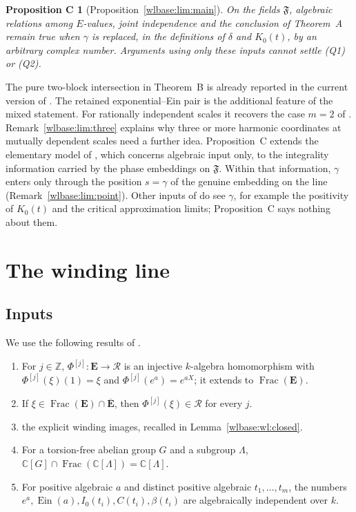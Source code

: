 \documentclass[11pt,a4paper]{article}
\newtheorem*{propC}{Proposition C}
\theoremstyle{definition}\newtheorem{definition}[theorem]{Definition}
\theoremstyle{remark}\newtheorem{remark}[theorem]{Remark}
\newcommand{\E}{\mathbf E}\newcommand{\Ebar}{\overline{\mathbf E}}
\newcommand{\cR}{\mathcal R}\newcommand{\cM}{\mathcal M}
\newcommand{\Ein}{\operatorname{Ein}}
\newcommand{\F}{\mathfrak F}\newcommand{\FF}{\mathbb F}
\newcommand{\C}{\mathbb C}\newcommand{\Z}{\mathbb Z}
\DeclareMathOperator{\Frac}{Frac}\DeclareMathOperator{\ord}{ord}
\begin{document}
\begin{propC}[Proposition~\ref{wlbase:lim:main}]
On the fields $\F$, algebraic relations among $E$-values, joint independence
and the conclusion of Theorem~A remain true when $\gamma$ is replaced, in the
definitions of $\delta$ and $K_0(t)$, by an arbitrary complex number.
Arguments using only these inputs cannot settle \textup{(Q1)} or
\textup{(Q2)}.
\end{propC}

The pure two-block intersection in Theorem~B is already reported in the
current version of \cite{EB}. The retained exponential--Ein pair is the
additional feature of the mixed statement. For
rationally independent scales it recovers the case $m=2$ of
\cite[Theorem~mbmulti:main]{EB}. Remark~\ref{wlbase:lim:three} explains why three or
more harmonic coordinates at mutually dependent scales need a further idea.
Proposition~C extends the elementary model of \cite[\S``Scope'']{EB}, which
concerns algebraic input only, to the integrality information carried by the
phase embeddings on $\F$. Within that information, $\gamma$ enters only
through the position $s=\gamma$ of the genuine embedding on the line
(Remark~\ref{wlbase:lim:point}). Other inputs of \cite{EB} do see $\gamma$, for
example the positivity of $K_0(t)$ and the critical approximation limits;
Proposition~C says nothing about them.

\section{The winding line}

\subsection{Inputs}
We use the following results of \cite{EB}.
\begin{enumerate}
\item[(I1)] \cite[Lemma~mbc:continued]{EB} For $j\in\Z$,
$\Phi^{[j]}\colon\E\to\cR$ is an injective $k$-algebra homomorphism with
$\Phi^{[j]}(\xi)(1)=\xi$ and $\Phi^{[j]}(e^a)=e^{aX}$; it extends to
$\Frac(\E)$.
\item[(I2)] \cite[Lemma~mbc:pole]{EB} If $\xi\in\Frac(\E)\cap\Ebar$, then
$\Phi^{[j]}(\xi)\in\cR$ for every $j$.
\item[(I3)] \cite[(mbc:Iimage)--(mbc:Yimage), (dcr:eta-image)]{EB} the explicit
winding images, recalled in Lemma~\ref{wlbase:wl:closed}.
\item[(I4)] \cite[Lemma~mbmulti:cosets]{EB} For a torsion-free abelian group
$G$ and a subgroup $\Lambda$, $\C[G]\cap\Frac(\C[\Lambda])=\C[\Lambda]$.
\item[(I5)] \cite[Theorem~cf:joint]{EB} For positive algebraic $a$ and
distinct positive algebraic $t_1,\dots,t_m$, the numbers
$e^a,\Ein(a),I_0(t_i),C(t_i),\beta(t_i)$ are algebraically independent over $k$.
\end{enumerate}
\end{document}
